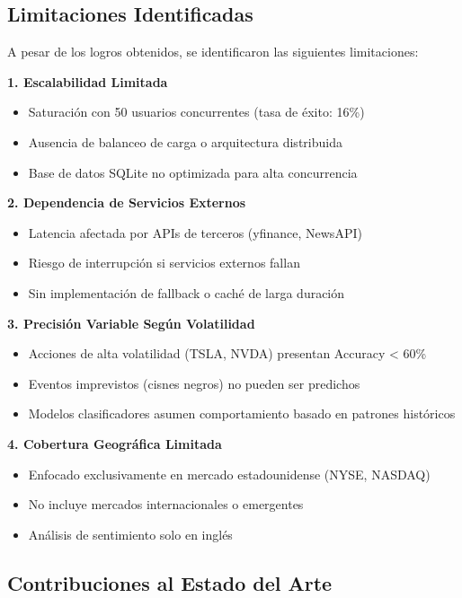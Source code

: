 \documentclass[12pt,a4paper]{report}
\begin{document}
\subsection{Limitaciones Identificadas}

A pesar de los logros obtenidos, se identificaron las siguientes limitaciones:

\textbf{1. Escalabilidad Limitada}
\begin{itemize}
    \item Saturación con 50 usuarios concurrentes (tasa de éxito: 16\%)
    \item Ausencia de balanceo de carga o arquitectura distribuida
    \item Base de datos SQLite no optimizada para alta concurrencia
\end{itemize}

\textbf{2. Dependencia de Servicios Externos}
\begin{itemize}
    \item Latencia afectada por APIs de terceros (yfinance, NewsAPI)
    \item Riesgo de interrupción si servicios externos fallan
    \item Sin implementación de fallback o caché de larga duración
\end{itemize}

\textbf{3. Precisión Variable Según Volatilidad}
\begin{itemize}
    \item Acciones de alta volatilidad (TSLA, NVDA) presentan Accuracy < 60\%
    \item Eventos imprevistos (cisnes negros) no pueden ser predichos
    \item Modelos clasificadores asumen comportamiento basado en patrones históricos
\end{itemize}

\textbf{4. Cobertura Geográfica Limitada}
\begin{itemize}
    \item Enfocado exclusivamente en mercado estadounidense (NYSE, NASDAQ)
    \item No incluye mercados internacionales o emergentes
    \item Análisis de sentimiento solo en inglés
\end{itemize}

\subsection{Contribuciones al Estado del Arte}
\end{document}

